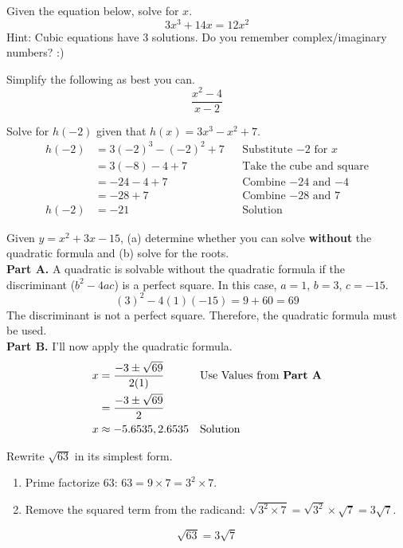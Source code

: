 \begin{problem}[title=Problem 6]
    Given the equation below, solve for $x$.
    \[
        3x^3 + 14x = 12x^2   
    \]
    Hint: Cubic equations have $3$ solutions. Do you remember complex/imaginary numbers? :)
\end{problem}

\begin{problem}[title=Problem 7]
Simplify the following as best you can.
\[
    \frac{x^2-4}{x-2}
\]
\end{problem}

\clearpage
\begin{solution}[title=Solution 1]
    Solve for $h(-2)$ given that $h(x) = 3x^3 - x^2 + 7$.
    \begin{align*}
        h(-2) &= 3(-2)^3 - (-2)^2 + 7 && \text{Substitute $-2$ for $x$}\\
        &= 3(-8) - 4 + 7 && \text{Take the cube and square}\\
        &= -24 - 4 + 7 && \text{Combine $-24$ and $-4$}\\
        &= -28 + 7 && \text{Combine $-28$ and $7$}\\
        h(-2) &= -21 && \text{Solution}
    \end{align*}
\end{solution}

\begin{solution}[title=Solution 2]
    Given $y = x^2 + 3x - 15$, (a) determine whether you can solve \textbf{without} the quadratic formula and (b) solve for the roots.\\
    \textbf{Part A.} A quadratic is solvable without the quadratic formula if the discriminant ($b^2 - 4ac$) is a perfect square. In this case, $a = 1$, $b = 3$, $c = -15$.
    \[
        (3)^2 - 4(1)(-15) = 9 + 60 = 69
    \]
    The discriminant is not a perfect square. Therefore, the quadratic formula must be used.\\
    \textbf{Part B.} I'll now apply the quadratic formula.
    \begin{align*}
        x &= \frac{-3 \pm \sqrt{69}}{2(1)} && \text{Use Values from \textbf{Part A}} \\
        &= \frac{-3 \pm \sqrt{69}}{2} \\
        x &\approx -5.6535, 2.6535 && \text{Solution}
    \end{align*}
\end{solution}
\clearpage
\begin{solution}[title=Solution 3]
    Rewrite $\sqrt{63}$ in its simplest form.
    \begin{enumerate}
        \item Prime factorize 63: $63 = 9 \times 7 = 3^2 \times 7$.
        \item Remove the squared term from the radicand: $\sqrt{3^2 \times 7} = \sqrt{3^2} \times \sqrt{7} = 3\sqrt{7}$.
    \end{enumerate}
    \[
        \boxed{\sqrt{63} = 3\sqrt{7}}
    \]
\end{solution}

